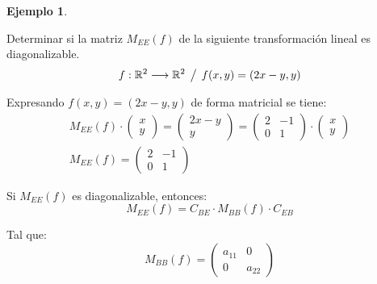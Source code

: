 \documentclass[a5paper,12pt,twoside]{book}
\newtheorem{example}{{Ejemplo}}[chapter]
\begin{document}
\begin{mdframed}[style=ExampleFrame]
    \begin{example}
    \end{example}
    Determinar si la matriz $M_{EE}(f)$ de la siguiente transformación lineal es diagonalizable.
    \begin{equation*}
        f:\mathbb{R}^2\longrightarrow\mathbb{R}^2\hspace{1ex} \big/ \hspace{1ex} f(x,y)=(2x-y , y)
    \end{equation*}
    
    Expresando $f(x,y)=(2x-y , y)$ de forma matricial se tiene:
    \begin{gather*}
        M_{EE}(f) \cdot
        \begin{pmatrix}
            x
            \\
            y
        \end{pmatrix}
        =
        \begin{pmatrix}
            2x-y
            \\
            y
        \end{pmatrix}
        =
        \begin{pmatrix}
            2 & -1
            \\
            0 & 1
        \end{pmatrix}
        \cdot
        \begin{pmatrix}
            x
            \\
            y
        \end{pmatrix}
        \\[1ex]
        M_{EE}(f) =
        \begin{pmatrix}
            2 & -1
            \\
            0 & 1
        \end{pmatrix}
    \end{gather*}
    
    Si $M_{EE}(f)$ es diagonalizable, entonces:
    \begin{equation*}
        M_{EE}(f) = C_{BE} \cdot M_{BB}(f) \cdot C_{EB}
    \end{equation*}
    
    Tal que:
    \begin{equation*}
        M_{BB}(f) =
        \begin{pmatrix}
            a_{11} & 0
            \\
            0 & a_{22}
        \end{pmatrix}
    \end{equation*}
    

\end{mdframed}
\end{document}
